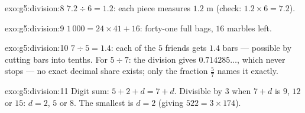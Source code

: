 \begin{solution}{exo:g5:division:8}
$7.2 \div 6 = 1.2$: each piece measures $1.2$ m (check:
$1.2 \times 6 = 7.2$).
\end{solution}

\begin{solution}{exo:g5:division:9}
$1\,000 = 24 \times 41 + 16$: forty-one full bags, $16$ marbles
left.
\end{solution}

\begin{solution}{exo:g5:division:10}
$7 \div 5 = 1.4$: each of the $5$ friends gets $1.4$ bars ---
possible by cutting bars into tenths. For $5 \div 7$: the division
gives $0.714285\dots$, which never stops --- no exact decimal share
exists; only the fraction $\frac57$ names it exactly.
\end{solution}

\begin{solution}{exo:g5:division:11}
Digit sum: $5 + 2 + d = 7 + d$. Divisible by $3$ when $7 + d$ is
$9$, $12$ or $15$: $d = 2$, $5$ or $8$. The smallest is $d = 2$
(giving $522 = 3 \times 174$).
\end{solution}
